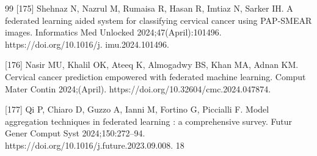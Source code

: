 \documentclass[final,5p,times,twocolumn,authoryear]{elsarticle}
\begin{document}
\begin{thebibliography}{99}
 [175] Shehnaz N, Nazrul M, Rumaisa R, Hasan R, Imtiaz N, Sarker IH. A federated learning aided system for classifying cervical cancer using PAP-SMEAR images. Informatics Med Unlocked 2024;47(April):101496. https://doi.org/10.1016/j. imu.2024.101496.

 [176] Nasir MU, Khalil OK, Ateeq K, Almogadwy BS, Khan MA, Adnan KM. Cervical cancer prediction empowered with federated machine learning. Comput Mater Contin 2024;(April). https://doi.org/10.32604/cmc.2024.047874.

 [177] Qi P, Chiaro D, Guzzo A, Ianni M, Fortino G, Piccialli F. Model aggregation techniques in federated learning : a comprehensive survey. Futur Gener Comput Syst 2024;150:272–94. https://doi.org/10.1016/j.future.2023.09.008. 18
\end{thebibliography}
\end{document}
